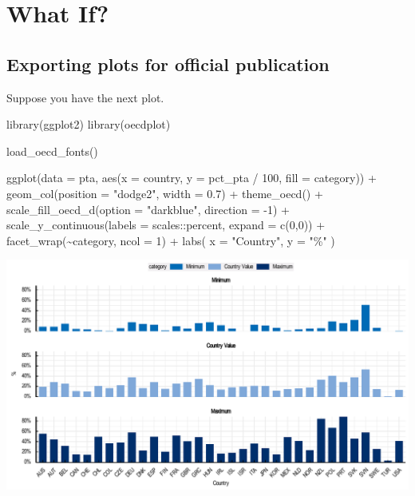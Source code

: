 \documentclass[
  11pt,
  oneside]{report}
\newenvironment{Shaded}{\begin{snugshade}}{\end{snugshade}}
\newcommand{\AttributeTok}[1]{\textcolor[rgb]{0.77,0.63,0.00}{#1}}
\newcommand{\DecValTok}[1]{\textcolor[rgb]{0.00,0.00,0.81}{#1}}
\newcommand{\FloatTok}[1]{\textcolor[rgb]{0.00,0.00,0.81}{#1}}
\newcommand{\FunctionTok}[1]{\textcolor[rgb]{0.00,0.00,0.00}{#1}}
\newcommand{\NormalTok}[1]{#1}
\newcommand{\SpecialCharTok}[1]{\textcolor[rgb]{0.00,0.00,0.00}{#1}}
\newcommand{\StringTok}[1]{\textcolor[rgb]{0.31,0.60,0.02}{#1}}
\begin{document}
\hypertarget{what-if}{%
\chapter{What If?}\label{what-if}}

\hypertarget{exporting-plots-for-official-publication}{%
\section{Exporting plots for official
publication}\label{exporting-plots-for-official-publication}}

Suppose you have the next plot.

\begin{Shaded}
\begin{Highlighting}[]
\FunctionTok{library}\NormalTok{(ggplot2)}
\FunctionTok{library}\NormalTok{(oecdplot)}

\FunctionTok{load\_oecd\_fonts}\NormalTok{()}

\FunctionTok{ggplot}\NormalTok{(}\AttributeTok{data =}\NormalTok{ pta, }\FunctionTok{aes}\NormalTok{(}\AttributeTok{x =}\NormalTok{ country, }\AttributeTok{y =}\NormalTok{ pct\_pta }\SpecialCharTok{/} \DecValTok{100}\NormalTok{, }\AttributeTok{fill =}\NormalTok{ category)) }\SpecialCharTok{+}
  \FunctionTok{geom\_col}\NormalTok{(}\AttributeTok{position =} \StringTok{"dodge2"}\NormalTok{, }\AttributeTok{width =} \FloatTok{0.7}\NormalTok{) }\SpecialCharTok{+}
  \FunctionTok{theme\_oecd}\NormalTok{() }\SpecialCharTok{+}
  \FunctionTok{scale\_fill\_oecd\_d}\NormalTok{(}\AttributeTok{option =} \StringTok{"darkblue"}\NormalTok{, }\AttributeTok{direction =} \SpecialCharTok{{-}}\DecValTok{1}\NormalTok{) }\SpecialCharTok{+}
  \FunctionTok{scale\_y\_continuous}\NormalTok{(}\AttributeTok{labels =}\NormalTok{ scales}\SpecialCharTok{::}\NormalTok{percent, }\AttributeTok{expand =} \FunctionTok{c}\NormalTok{(}\DecValTok{0}\NormalTok{,}\DecValTok{0}\NormalTok{)) }\SpecialCharTok{+}
  \FunctionTok{facet\_wrap}\NormalTok{(}\SpecialCharTok{\textasciitilde{}}\NormalTok{category, }\AttributeTok{ncol =} \DecValTok{1}\NormalTok{) }\SpecialCharTok{+}
  \FunctionTok{labs}\NormalTok{(}
    \AttributeTok{x =} \StringTok{"Country"}\NormalTok{,}
    \AttributeTok{y =} \StringTok{"\%"}
\NormalTok{  )}
\end{Highlighting}
\end{Shaded}

\begin{center}\includegraphics{book_figures/whatif_emf_1-1} \end{center}
\end{document}
